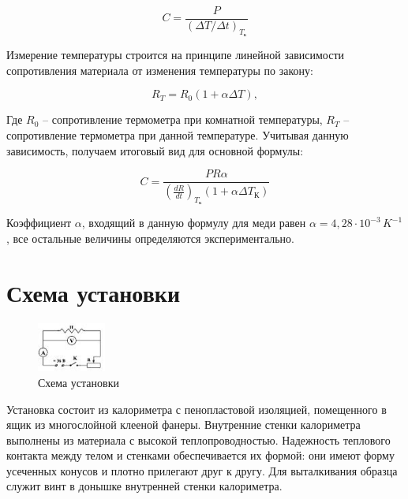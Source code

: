 \documentclass[12pt,a4paper]{article}
\begin{document}
	\begin{equation}
		C = \frac{P}{\left( \Delta T / \Delta t \right)_{T_{\text{к}}}}
		\label{eq:final_eq_for_capacity}
	\end{equation}
	
	Измерение температуры строится на принципе линейной зависимости сопротивления материала от изменения температуры по закону:
	
	\begin{equation}
		R_{T} = R_{0} \left( 1 + \alpha \Delta T \right),
	\end{equation}
	
	Где $R_{0}$ -- сопротивление термометра при комнатной температуры, $R_{T}$ -- сопротивление термометра при данной температуре. Учитывая данную зависимость, получаем итоговый вид для основной формулы:
	
	\begin{equation}
		C = \frac{PR\alpha}{\left( \frac{dR}{dt} \right)_{T_{\text{к}}}\left( 1 + \alpha \Delta T_{\text{К}} \right)}
		\label{eq:capacity}
	\end{equation}	 
	
	Коэффициент $\alpha$, входящий в данную формулу для меди равен $\alpha = 4,28 \cdot 10^{-3} \, K^{-1}$, все остальные величины определяются экспериментально.
	
	\newpage

\section{Схема установки}
	
	\begin{figure}
		\vspace{-2.5ex}
		\begin{center}
			\includegraphics[width = 0.2\textwidth]{schem_of_facility}
			\caption{Схема установки}
			\label{fig:schem_of_facility}
		\end{center}
	\end{figure}
	
	Установка состоит из калориметра с пенопластовой изоляцией, помещенного в ящик из многослойной клееной фанеры. Внутренние стенки калориметра выполнены из материала с высокой теплопроводностью. Надежность теплового контакта между телом и стенками обеспечивается их формой: они имеют форму усеченных конусов и плотно прилегают друг к другу. Для выталкивания образца служит винт в донышке внутренней стенки калориметра.
	
\end{document}
